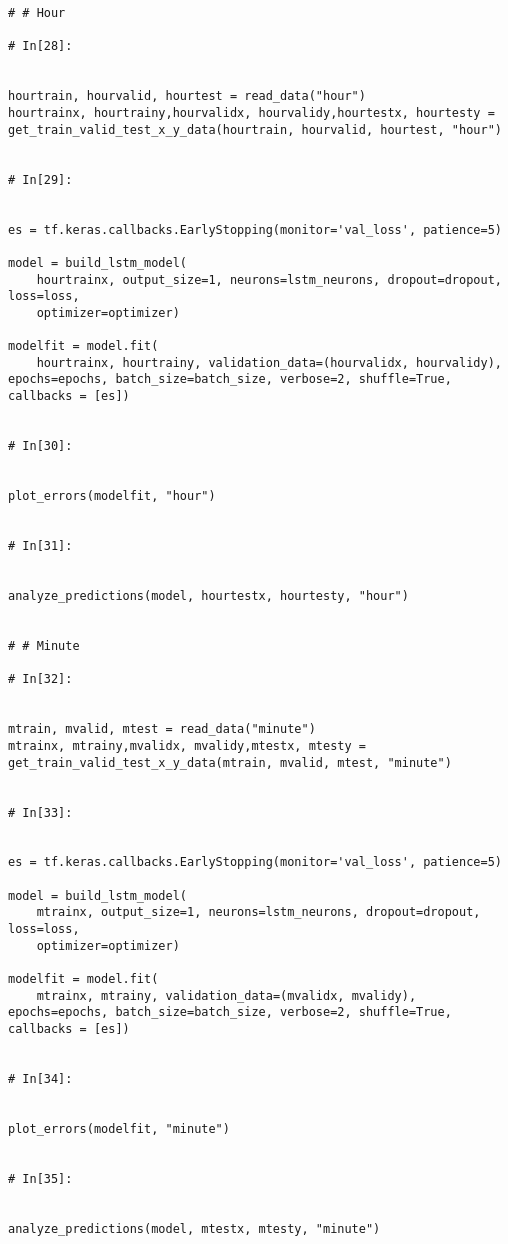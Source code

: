 \documentclass[12pt,a4paper]{article}
\begin{document}
\begin{lstlisting}[breaklines]
# # Hour

# In[28]:


hourtrain, hourvalid, hourtest = read_data("hour")
hourtrainx, hourtrainy,hourvalidx, hourvalidy,hourtestx, hourtesty = get_train_valid_test_x_y_data(hourtrain, hourvalid, hourtest, "hour")


# In[29]:


es = tf.keras.callbacks.EarlyStopping(monitor='val_loss', patience=5)

model = build_lstm_model(
    hourtrainx, output_size=1, neurons=lstm_neurons, dropout=dropout, loss=loss,
    optimizer=optimizer)

modelfit = model.fit(
    hourtrainx, hourtrainy, validation_data=(hourvalidx, hourvalidy), epochs=epochs, batch_size=batch_size, verbose=2, shuffle=True, callbacks = [es])


# In[30]:


plot_errors(modelfit, "hour")


# In[31]:


analyze_predictions(model, hourtestx, hourtesty, "hour")


# # Minute

# In[32]:


mtrain, mvalid, mtest = read_data("minute")
mtrainx, mtrainy,mvalidx, mvalidy,mtestx, mtesty = get_train_valid_test_x_y_data(mtrain, mvalid, mtest, "minute")


# In[33]:


es = tf.keras.callbacks.EarlyStopping(monitor='val_loss', patience=5)

model = build_lstm_model(
    mtrainx, output_size=1, neurons=lstm_neurons, dropout=dropout, loss=loss,
    optimizer=optimizer)

modelfit = model.fit(
    mtrainx, mtrainy, validation_data=(mvalidx, mvalidy), epochs=epochs, batch_size=batch_size, verbose=2, shuffle=True, callbacks = [es])


# In[34]:


plot_errors(modelfit, "minute")


# In[35]:


analyze_predictions(model, mtestx, mtesty, "minute")


\end{lstlisting}



\end{document}
